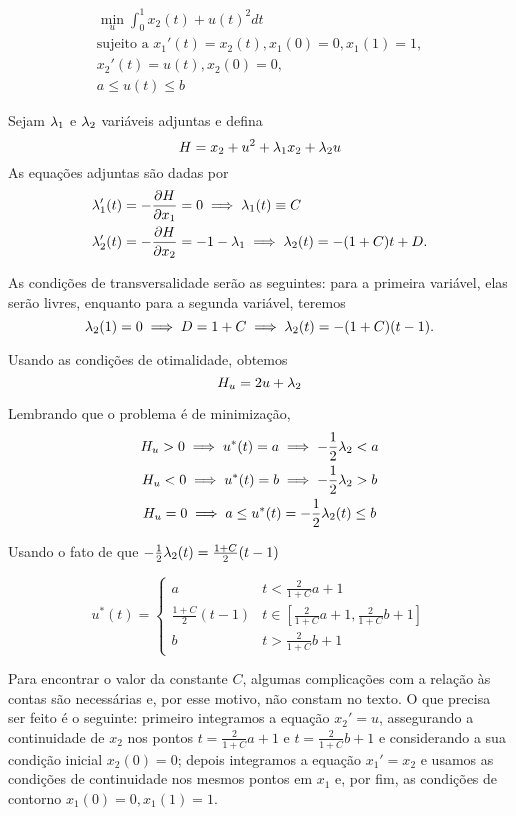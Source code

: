 \begin{example}
    \begin{gather*}
        \min_u \int_0^1 x_2(t) + u(t)^2 dt \\
        \text{sujeito a  }x_1'(t) = x_2(t), x_1(0) = 0, x_1(1) = 1, \\
        x_2 '(t) = u(t), x_2(0) = 0, \\
        a \le u(t) \le b
    \end{gather*}
\end{example}

Sejam $\lambda_1$ e $\lambda_2$ variáveis adjuntas e defina 
$$
H = x_2 + u^2 + \lambda_1x_2 + \lambda_2 u
$$
As equações adjuntas são dadas por 
\begin{align*}
    &\lambda_1 '(t) = -\frac{\partial H}{\partial x_1} = 0 \implies \lambda_1(t) \equiv C \\
    &\lambda_2 '(t) = -\frac{\partial H}{\partial x_2} = - 1 - \lambda_1 \implies \lambda_2(t) = -(1 + C)t + D.
\end{align*}

As condições de transversalidade serão as seguintes: para a primeira variável,
elas serão livres, enquanto para a segunda variável, teremos 
$$\lambda_2(1) = 0 \implies D = 1 + C \implies \lambda_2(t) = -(1 + C)(t-1).$$ 

Usando as condições de otimalidade, obtemos 
$$
H_u = 2u + \lambda_2 
$$

Lembrando que o problema é de minimização,
\begin{gather*}
    H_u > 0 \implies u^*(t) = a \implies -\frac{1}{2}\lambda_2 < a \\
    H_u < 0 \implies u^*(t) = b \implies -\frac{1}{2}\lambda_2 > b \\
    H_u = 0  \implies a \le u^*(t) =  -\frac{1}{2}\lambda_2(t) \le b 
\end{gather*}

Usando o fato de que $-\frac{1}{2}\lambda_2(t) = \frac{1+C}{2}(t-1)$

$$
u^*(t) = \begin{cases}
    a &t < \frac{2}{1 + C} a + 1 \\
    \frac{1 + C}{2}(t-1) &t \in \left[\frac{2}{1 + C} a + 1, \frac{2}{1 + C}b + 1\right] \\
    b &t > \frac{2}{1 + C}b + 1
\end{cases}
$$

Para encontrar o valor da constante $C$, algumas complicações com a relação às
contas são necessárias e, por esse motivo, não constam no texto. O que precisa
ser feito é o seguinte: primeiro integramos a equação $x_2 ' = u$, 
assegurando a continuidade de $x_2$ nos pontos $t = \frac{2}{1 + C} a + 1
\text{ e } t = \frac{2}{1 + C} b + 1$ e considerando a sua condição inicial
$x_2(0) = 0$; depois integramos a equação $x_1 ' = x_2$ e usamos as condições
de continuidade nos mesmos pontos em $x_1$ e, por fim, as condições de
contorno $x_1(0) = 0, x_1(1) = 1$.


